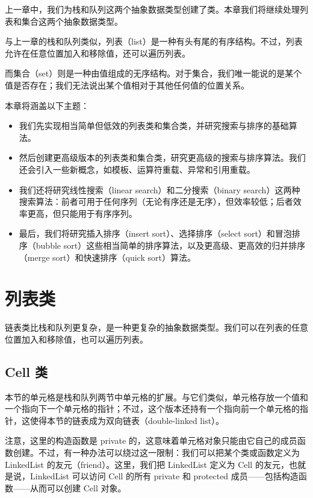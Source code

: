 \renewcommand{\codeInset}{63bp}
上一章中，我们为栈和队列这两个抽象数据类型创建了类。本章我们将继续处理列表和集合这两个抽象数据类型。

与上一章的栈和队列类似，列表（list）是一种有头有尾的有序结构。不过，列表允许在任意位置加入和移除值，还可以遍历列表。

而集合（set）则是一种由值组成的无序结构。对于集合，我们唯一能说的是某个值是否存在；我们无法说出某个值相对于其他任何值的位置关系。

本章将涵盖以下主题：

\begin{itemize}
\item 我们先实现相当简单但低效的列表类和集合类，并研究搜索与排序的基础算法。
\item 然后创建更高级版本的列表类和集合类，研究更高级的搜索与排序算法。我们还会引入一些新概念，如模板、运算符重载、异常和引用重载。
\item 我们还将研究线性搜索（linear search）和二分搜索（binary search）这两种搜索算法：前者可用于任何序列（无论有序还是无序），但效率较低；后者效率更高，但只能用于有序序列。
\item 最后，我们将研究插入排序（insert sort）、选择排序（select sort）和冒泡排序（bubble sort）这些相当简单的排序算法，以及更高级、更高效的归并排序（merge sort）和快速排序（quick sort）算法。
\end{itemize}

\section{列表类}

链表类比栈和队列更复杂，是一种更复杂的抽象数据类型。我们可以在列表的任意位置加入和移除值，也可以遍历列表。

\subsection{Cell 类}

本节的单元格是栈和队列两节中单元格的扩展。与它们类似，单元格存放一个值和一个指向下一个单元格的指针；不过，这个版本还持有一个指向前一个单元格的指针，这使得本节的链表成为双向链表（double-linked list）。

注意，这里的构造函数是 private 的，这意味着单元格对象只能由它自己的成员函数创建。不过，有一种办法可以绕过这一限制：我们可以把某个类或函数定义为 LinkedList 的友元（friend）。这里，我们把 LinkedList 定义为 Cell 的友元，也就是说，LinkedList 可以访问 Cell 的所有 private 和 protected 成员——包括构造函数——从而可以创建 Cell 对象。

